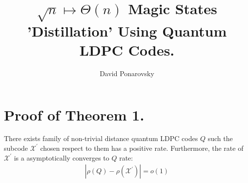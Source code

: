 \documentclass[manuscript,screen,review]{acmart}
\begin{document}

\title{ $\sqrt{n} \mapsto \Theta(n)$  Magic States 'Distillation' Using
Quantum LDPC Codes. }
\author{David Ponarovsky}
\maketitle

\newcommand*{\Mbas}{\mathcal{X}^\prime}
\newcommand*{\bas}{\mathcal{X}}
\newcommand*{\sMbas}{\Mbas}
\newcommand*{\QQ}{C_{X}/C_{Z}^\perp }
\newcommand*{\trig}{ Triorthogonal }
\newcommand*{\Hyp}{ Hyperproduct }
\newcommand*{\Cin}{ C_{\text{initial}} }
\newcommand*{\Ctan}{ C_{\text{Tan}} }




\section{Proof of Theorem 1.}
\begin{claim}
  \label{claim:notempty}
  There exists family of non-trivial distance quantum LDPC codes $Q$ such the subcode $\sMbas$ chosen respect to them has a positive rate. Furthermore, the rate of $\sMbas$ is a asymptotically converges to $Q$ rate:
  \begin{equation*}
    \begin{split}
      \left| \rho\left(Q\right) - \rho\left(\sMbas\right) \right| = o(1)
    \end{split}
  \end{equation*}
\end{claim}
\end{document}
